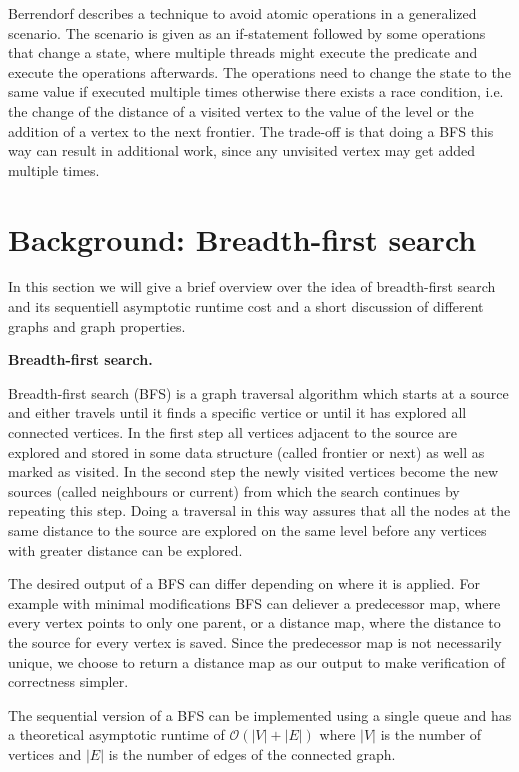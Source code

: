 \documentclass[letterpaper]{article}
\newcommand{\mypar}[1]{{\bf #1.}} %
\begin{document}
	
	Berrendorf\cite{Berrendorf:14} describes a technique to avoid atomic operations in a generalized scenario. The scenario is given as an if-statement followed by some operations that change a state, where multiple threads might execute the predicate and execute the operations afterwards. The operations need to change the state to the same value if executed multiple times otherwise there exists a race condition, i.e. the change of the distance of a visited vertex to the value of the level or the addition of a vertex to the next frontier. The trade-off is that doing a BFS this way can result in additional work, since any unvisited vertex may get added multiple times.
	
	
	\section{Background: Breadth-first search}\label{sec:background}
	
	
	In this section we will give a brief overview over the idea of breadth-first search and its sequentiell asymptotic runtime cost and a short discussion of different graphs and graph properties. 
	
	
	\mypar{Breadth-first search}
		
	Breadth-first search (BFS) is a graph traversal algorithm which starts at a source and either travels until it finds a specific vertice or until it has explored all connected vertices. In the first step all vertices adjacent to the source are explored and stored in some data structure (called frontier or next) as well as marked as visited. In the second step the newly visited vertices become the new sources (called neighbours or current) from which the search continues by repeating this step. Doing a traversal in this way assures that all the nodes at the same distance to the source are explored on the same level before any vertices with greater distance can be explored. 
	
	The desired output of a BFS can differ depending on where it is applied. For example with minimal modifications BFS can deliever a predecessor map, where every vertex points to only one parent, or a distance map, where the distance to the source for every vertex is saved. Since the predecessor map is not necessarily unique, we choose to return a distance map as our output to make verification of correctness simpler.  
	
	The sequential version of a BFS can be implemented using a single queue and has a theoretical asymptotic runtime of $\mathcal{O}(\left|V\right|+\left|E\right|)$ where $\left|V\right|$ is the number of vertices and $\left|E\right|$ is the number of edges of the connected graph.
	
\end{document}

